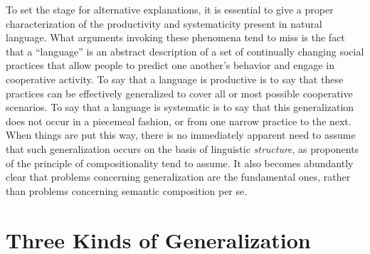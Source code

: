 To set the stage for alternative explanations, it is essential to give a proper characterization of the productivity and systematicity present in natural language. What arguments invoking these phenomena tend to miss is the fact that a ``language'' is an abstract description of a set of continually changing social practices that allow people to predict one another's behavior and engage in cooperative activity. To say that a language is productive is to say that these practices can be effectively generalized to cover all or most possible cooperative scenarios. To say that a language is systematic is to say that this generalization does not occur in a piecemeal fashion, or from one narrow practice to the next. When things are put this way, there is no immediately apparent need to assume that such generalization occurs on the basis of linguistic \textit{structure}, as proponents of the principle of compositionality tend to assume. It also becomes abundantly clear that problems concerning generalization are the fundamental ones, rather than problems concerning semantic composition per se.

\section{Three Kinds of Generalization}

